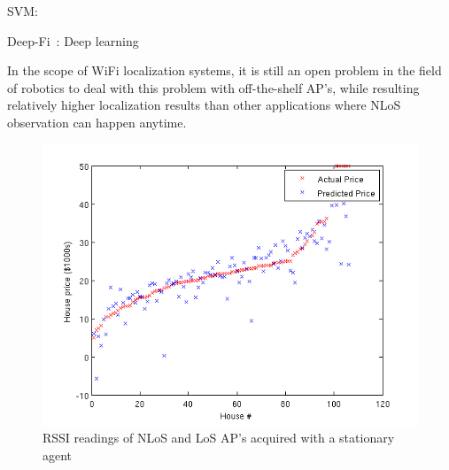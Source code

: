 \documentclass[letterpaper, 10 pt, conference]{ieeeconf}  %
\newcommand{\lorem}{
}
\begin{document}
    SVM:~\cite{wu2007location}
    \lorem{}

    Deep-Fi~\cite{wang2016csi}: Deep learning
    \lorem{}

    In the scope of WiFi localization systems, it is still an open problem in the field of robotics to deal with this problem with off-the-shelf AP's, while resulting relatively higher localization results than other applications where NLoS observation can happen anytime.

    \begin{figure}[thpb]
       \centering
       \includegraphics[scale=0.4]{figures/sample_figure.png}
       \caption{RSSI readings of NLoS and LoS AP's acquired with a stationary agent}
  \label{fig-sample}
    \end{figure}

\end{document}
